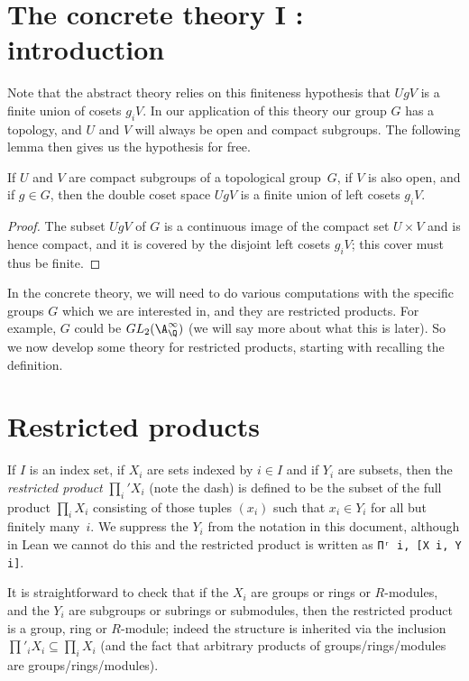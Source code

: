 \section{The concrete theory I : introduction}

Note that the abstract theory relies on this finiteness hypothesis that $UgV$
is a finite union of cosets $g_iV$. In our application of this theory our group
$G$ has a topology, and $U$ and $V$ will always be open and compact subgroups.
The following lemma then gives us the hypothesis for free.

\begin{lemma}
  \label{QuotientGroup.mk_image_finite_of_compact_of_open}
  \leanok
  If $U$ and $V$ are compact subgroups of a topological group~$G$,
  if $V$ is also open, and if $g\in G$, then the double coset space $UgV$
  is a finite union of left cosets $g_iV$.
\end{lemma}
\begin{proof}
  The subset $UgV$ of $G$ is a continuous image of the compact set $U\times V$
  and is hence compact, and it is covered by the disjoint left cosets $g_iV$;
  this cover must thus be finite.
\end{proof}

In the concrete theory, we will need to do various computations with the
specific groups $G$ which we are interested in, and they are restricted products.
For example, $G$ could be $GL_2(\A_{\Q}^\infty)$ (we will say more about
what this is later). So we now develop some theory for restricted products,
starting with recalling the definition.

\section{Restricted products}

If $I$ is an index set, if $X_i$ are sets indexed by $i\in I$ and if $Y_i$
are subsets, then the \emph{restricted product} $\prod_i'X_i$ (note the dash) is defined
to be the subset of the full product $\prod_i X_i$ consisting of those
tuples $(x_i)$ such that $x_i\in Y_i$ for all but finitely many~$i$. We suppress
the $Y_i$ from the notation in this document, although in Lean we cannot do this and
the restricted product is written as {\tt Πʳ i, [X i, Y i]}.

It is straightforward to check that if the $X_i$ are groups or rings or $R$-modules,
and the $Y_i$ are subgroups or subrings or submodules, then the restricted product
is a group, ring or $R$-module; indeed the structure is inherited via the
inclusion $\prod'_iX_i\subseteq\prod_iX_i$ (and the fact that arbitrary products
of groups/rings/modules are groups/rings/modules).

